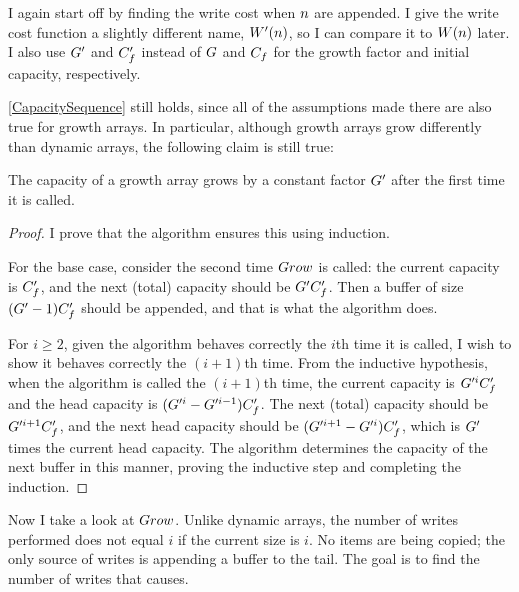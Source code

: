 \groarrayimpl

\tcomplex

I again start off by finding the write cost when $n$ are appended. I give the write cost function a slightly different name, $W'(n)$, so I can compare it to $W(n)$ later. I also use $G'$ and $C_f'$ instead of $G$ and $C_f$ for the growth factor and initial capacity, respectively.

\ref{CapacitySequence} still holds, since all of the assumptions made there are also true for growth arrays. In particular, although growth arrays grow differently than dynamic arrays, the following claim is still true:

\begin{lemma}
	The capacity of a growth array grows by a constant factor $G'$ after the first time it is called.
\end{lemma}

\begin{proof}
	I prove that the algorithm ensures this using induction.
	
	For the base case, consider the second time $Grow$ is called: the current capacity is $C_f'$, and the next (total) capacity should be $G'C_f'$. Then a buffer of size $(G' - 1)C_f'$ should be appended, and that is what the algorithm does.
	
	For $i \geq 2$, given the algorithm behaves correctly the $i$th time it is called, I wish to show it behaves correctly the $(i + 1)$th time. From the inductive hypothesis, when the algorithm is called the $(i + 1)$th time, the current capacity is $G'^iC_f'$ and the head capacity is $(G'^i - G'^{i - 1})C_f'$. The next (total) capacity should be $G'^{i + 1}C_f'$, and the next head capacity should be $(G'^{i + 1} - G'^i)C_f'$, which is $G'$ times the current head capacity. The algorithm determines the capacity of the next buffer in this manner, proving the inductive step and completing the induction.
\end{proof}

Now I take a look at $Grow$. Unlike dynamic arrays, the number of writes performed does not equal $i$ if the current size is $i$. No items are being copied; the only source of writes is appending a buffer to the tail. The goal is to find the number of writes that causes.

